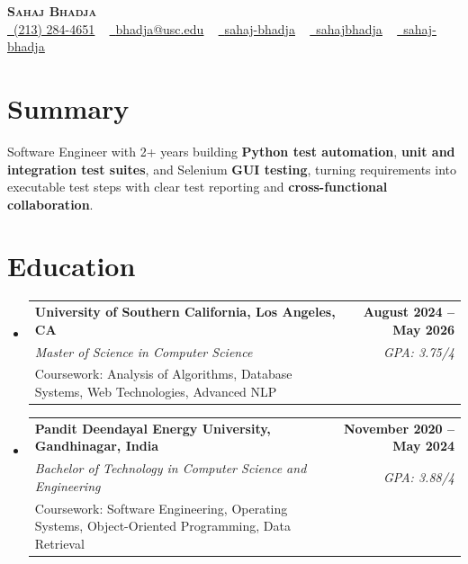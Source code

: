 \documentclass[letterpaper,10pt]{article}
\makeatletter
\newcommand{\sectionGap}{\vspace{-8pt}}
\newcommand{\resumeEduSubheading}[5]{\vspace{-1pt}\item\begin{tabular*}{1.0\textwidth}[t]{l@{\extracolsep{\fill}}r}\textbf{#1} & \textbf{\small #2} \\\textit{\small #3} & \textit{\small #4} \\\small #5 & \\\end{tabular*}\vspace{-4pt}}
\newcommand{\resumeSubHeadingListStart}{\begin{itemize}[leftmargin=0.0in, label={}]}
\newcommand{\resumeSubHeadingListEnd}{\end{itemize}}
\makeatother
\begin{document}
\begin{center}
{\Huge \scshape \textbf{Sahaj Bhadja}} \\ \vspace{1pt}
\small \href{tel:2132844651}{\faPhone\ \underline{(213) 284-4651}} ~ \href{mailto:bhadja@usc.edu}{\raisebox{-0.2\height}\faEnvelope\ \underline{bhadja@usc.edu}} ~
\href{https://www.linkedin.com/in/sahaj-bhadja/}{\raisebox{-0.2\height}\faLinkedin\ \underline{sahaj-bhadja}} ~ \href{https://github.com/SAHAJ-BHADJA}{\raisebox{-0.2\height}\faGithub\ \underline{sahajbhadja}} ~
\href{https://sahaj-bhadja.vercel.app/}{\raisebox{-0.2\height}\faGlobe\ \underline{sahaj-bhadja}}
\end{center}
\vspace{-16pt}
\section{Summary}
\begin{itemize}[leftmargin=0.15in, label={}]
\small{\item{Software Engineer with 2+ years building \textbf{Python test automation}, \textbf{unit and integration test suites}, and Selenium \textbf{GUI testing}, turning requirements into executable test steps with clear test reporting and \textbf{cross-functional collaboration}.}}
\end{itemize}
\sectionGap
\section{Education}
\resumeSubHeadingListStart
\resumeEduSubheading{University of Southern California, Los Angeles, CA}{August 2024 -- May 2026}{Master of Science in Computer Science}{GPA: 3.75/4}{Coursework: Analysis of Algorithms, Database Systems, Web Technologies, Advanced NLP}
\resumeEduSubheading{Pandit Deendayal Energy University, Gandhinagar, India}{November 2020 -- May 2024}{Bachelor of Technology in Computer Science and Engineering}{GPA: 3.88/4}{Coursework: Software Engineering, Operating Systems, Object-Oriented Programming, Data Retrieval}
\resumeSubHeadingListEnd
\sectionGap
\end{document}
